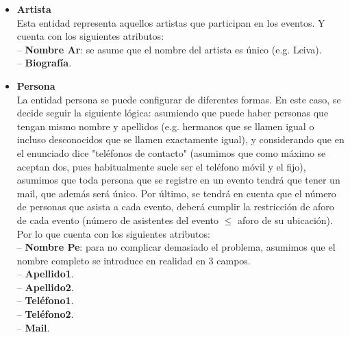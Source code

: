 \documentclass[12pt]{article}
\begin{document}
\begin{itemize}
        \item \textbf{Artista}\\
            Esta entidad representa aquellos artistas que participan en los eventos. 
            Y cuenta con los siguientes atributos: \\
                \hspace{0.5cm} -- {\bfseries Nombre Ar}: se asume que el nombre del artista es único (e.g. Leiva). \\
                \hspace{0.5cm} -- {\bfseries Biografía}.

        \item \textbf{Persona}\\
            La entidad persona se puede configurar de diferentes formas. En este caso, se decide seguir la siguiente lógica:
            asumiendo que puede haber personas que tengan mismo nombre y apellidos (e.g. hermanos que se llamen igual o incluso 
            desconocidos que se llamen exactamente igual), y considerando que en el enunciado dice "teléfonos de contacto" (asumimos que como máximo se 
            aceptan dos, pues habitualmente suele ser el teléfono móvil y el fijo),
            asumimos que toda persona que se registre en un evento tendrá que tener un mail, que además será único. 
            Por último, se tendrá en cuenta que el número de personas que asista a cada evento, deberá cumplir la restricción de aforo de cada evento 
            (número de asistentes del evento $\leq$ aforo de su ubicación).
            Por lo que cuenta con los siguientes atributos: \\
                \hspace{0.5cm} -- {\bfseries Nombre Pe}: para no complicar demasiado el problema, asumimos que el nombre completo se introduce en realidad en 3 campos. \\
                \hspace{0.5cm} -- {\bfseries Apellido1}. \\
                \hspace{0.5cm} -- {\bfseries Apellido2}. \\
                \hspace{0.5cm} -- {\bfseries Teléfono1}. \\
                \hspace{0.5cm} -- {\bfseries Teléfono2}. \\
                \hspace{0.5cm} -- {\bfseries Mail}.
        

\end{itemize}
\end{document}
